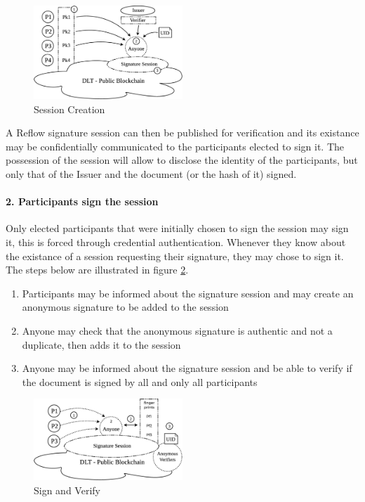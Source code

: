 \documentclass[twocolumn]{article}
\begin{document}
\begin{figure}
  \caption{Session Creation}
  \label{fig:create_session}
  \centering
  \includegraphics[width=0.5\textwidth]{create_session.eps}
\end{figure}

A Reflow signature session can then be published for verification and its existance may be confidentially communicated to the participants elected to sign it. The possession of the session will allow to disclose the identity of the participants, but only that of the Issuer and the document (or the hash of it) signed.

\paragraph*{2. Participants sign the session}

Only elected participants that were initially chosen to sign the
session may sign it, this is forced through credential
authentication. Whenever they know about the existance of a session
requesting their signature, they may chose to sign it. The steps below
are illustrated in figure \ref{fig:verify_sign}.

\begin{enumerate}
  \item Participants may be informed about the signature session and
    may create an anonymous signature to be added to the session 
  \item Anyone may check that the anonymous signature is authentic
    and not a duplicate, then adds it to the session
  \item Anyone may be informed about the signature session and be able to verify if the document is signed by all and only all participants
\end{enumerate}

\begin{figure}
  \caption{Sign and Verify}
  \label{fig:verify_sign}
  \centering
  \includegraphics[width=0.5\textwidth]{verify_sign.eps}
\end{figure}
\end{document}
